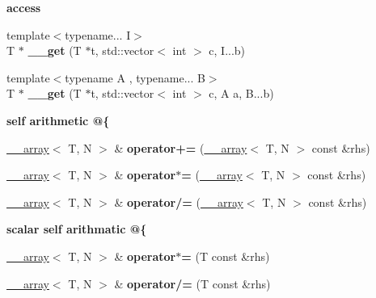 \begin{Indent}{\bf access}
\begin{DoxyCompactItemize}
\item 
\hypertarget{class____array_a90e1d2986c4dd2ce4368de7b35e7e041}{{\footnotesize template$<$typename... I$>$ }\\T $\ast$ {\bfseries \-\_\-\-\_\-get} (T $\ast$t, std\-::vector$<$ int $>$ c, I...\-b)}\label{class____array_a90e1d2986c4dd2ce4368de7b35e7e041}

\item 
\hypertarget{class____array_a9592a69b889f834b844232459d89edc9}{{\footnotesize template$<$typename A , typename... B$>$ }\\T $\ast$ {\bfseries \-\_\-\-\_\-get} (T $\ast$t, std\-::vector$<$ int $>$ c, A a, B...\-b)}\label{class____array_a9592a69b889f834b844232459d89edc9}

\end{DoxyCompactItemize}
\end{Indent}
\begin{Indent}{\bf self arithmetic @\{}\par
\begin{DoxyCompactItemize}
\item 
\hypertarget{class____array_a1fdacdb2b2a79effe9a11121648a3f44}{\hyperlink{class____array}{\-\_\-\-\_\-array}$<$ T, N $>$ \& {\bfseries operator+=} (\hyperlink{class____array}{\-\_\-\-\_\-array}$<$ T, N $>$ const \&rhs)}\label{class____array_a1fdacdb2b2a79effe9a11121648a3f44}

\item 
\hypertarget{class____array_a5b698b219ec8e62bab83528564caa579}{\hyperlink{class____array}{\-\_\-\-\_\-array}$<$ T, N $>$ \& {\bfseries operator$\ast$=} (\hyperlink{class____array}{\-\_\-\-\_\-array}$<$ T, N $>$ const \&rhs)}\label{class____array_a5b698b219ec8e62bab83528564caa579}

\item 
\hypertarget{class____array_af812f20cd83b4f54cb4b0e780ed07b11}{\hyperlink{class____array}{\-\_\-\-\_\-array}$<$ T, N $>$ \& {\bfseries operator/=} (\hyperlink{class____array}{\-\_\-\-\_\-array}$<$ T, N $>$ const \&rhs)}\label{class____array_af812f20cd83b4f54cb4b0e780ed07b11}

\end{DoxyCompactItemize}
\end{Indent}
\begin{Indent}{\bf scalar self arithmatic @\{}\par
\begin{DoxyCompactItemize}
\item 
\hypertarget{class____array_abf242f49019b906d3f846fc185cc38ae}{\hyperlink{class____array}{\-\_\-\-\_\-array}$<$ T, N $>$ \& {\bfseries operator$\ast$=} (T const \&rhs)}\label{class____array_abf242f49019b906d3f846fc185cc38ae}

\item 
\hypertarget{class____array_ad0a349749a91dc7379c626dc13b6f26c}{\hyperlink{class____array}{\-\_\-\-\_\-array}$<$ T, N $>$ \& {\bfseries operator/=} (T const \&rhs)}\label{class____array_ad0a349749a91dc7379c626dc13b6f26c}

\end{DoxyCompactItemize}
\end{Indent}
